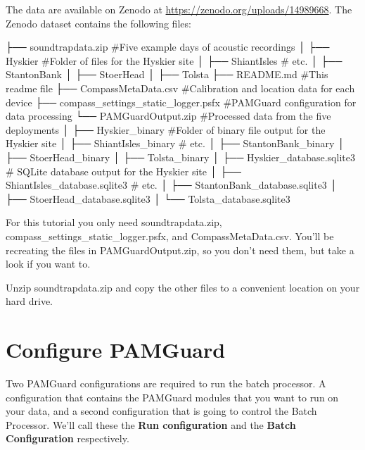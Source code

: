\documentclass[
]{article}
\newenvironment{Shaded}{\begin{snugshade}}{\end{snugshade}}
\newcommand{\NormalTok}[1]{\textcolor[rgb]{0.00,0.23,0.31}{#1}}
\begin{document}
The data are available on Zenodo at
\url{https://zenodo.org/uploads/14989668}. The Zenodo dataset contains
the following files:

\begin{Shaded}
\begin{Highlighting}[]
\NormalTok{├── soundtrapdata.zip                  \#Five example days of acoustic recordings}
\NormalTok{│   ├── Hyskier                        \#Folder of files for the Hyskier site}
\NormalTok{│   ├── ShiantIsles                    \# etc.}
\NormalTok{│   ├── StantonBank}
\NormalTok{│   ├── StoerHead}
\NormalTok{│   ├── Tolsta}
\NormalTok{├── README.md                          \#This readme file}
\NormalTok{├── CompassMetaData.csv                \#Calibration and location data for each device}
\NormalTok{├── compass\_settings\_static\_logger.psfx \#PAMGuard configuration for data processing}
\NormalTok{└── PAMGuardOutput.zip                 \#Processed data from the five deployments}
\NormalTok{│   ├── Hyskier\_binary                 \#Folder of binary file output for the Hyskier site}
\NormalTok{│   ├── ShiantIsles\_binary             \# etc.}
\NormalTok{│   ├── StantonBank\_binary }
\NormalTok{│   ├── StoerHead\_binary }
\NormalTok{│   ├── Tolsta\_binary }
\NormalTok{│   ├── Hyskier\_database.sqlite3       \# SQLite database output for the Hyskier site}
\NormalTok{│   ├── ShiantIsles\_database.sqlite3   \# etc.}
\NormalTok{│   ├── StantonBank\_database.sqlite3 }
\NormalTok{│   ├── StoerHead\_database.sqlite3 }
\NormalTok{│   └── Tolsta\_database.sqlite3 }
\end{Highlighting}
\end{Shaded}

For this tutorial you only need soundtrapdata.zip,
compass\_settings\_static\_logger.psfx, and CompassMetaData.csv. You'll
be recreating the files in PAMGuardOutput.zip, so you don't need them,
but take a look if you want to.

Unzip soundtrapdata.zip and copy the other files to a convenient
location on your hard drive.

\section{Configure PAMGuard}\label{configure-pamguard}

Two PAMGuard configurations are required to run the batch processor. A
configuration that contains the PAMGuard modules that you want to run on
your data, and a second configuration that is going to control the Batch
Processor. We'll call these the \textbf{Run configuration} and the
\textbf{Batch Configuration} respectively.
\end{document}
